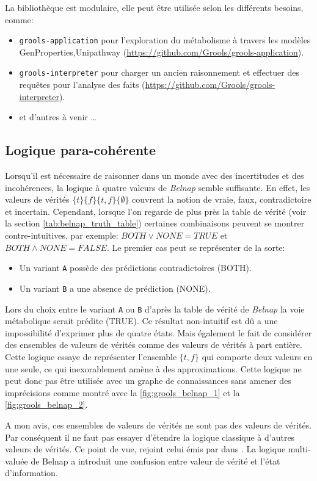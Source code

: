 \begin{refsegment}
La bibliothèque est modulaire, elle peut être utilisée selon les différents besoins, comme:\nolisttopbreak
\begin{itemize}
	\item \texttt{grools-application} pour l'exploration du métabolisme à travers les modèles GenProperties,Unipathway  (\url{https://github.com/Grools/grools-application}).
	\item \texttt{grools-interpreter} pour charger un ancien raisonnement et effectuer des requêtes pour l'analyse des faits (\url{https://github.com/Grools/grools-interpreter}).
	\item et d'autres à venir \ldots
\end{itemize}

\subsection{Logique para-cohérente}
Lorsqu'il est nécessaire de raisonner dans un monde avec des incertitudes et des incohérences, la logique à quatre valeurs de \textit{Belnap} semble suffisante. En effet, les valeurs de vérités $\{t\} \{f\} \{t,f\} \{\emptyset\}$ couvrent la notion de vraie, faux, contradictoire et incertain. Cependant, lorsque l'on regarde de plus près la table de vérité  (voir la section   \cref{tab:belnap_truth_table}) certaines combinaisons peuvent se montrer contre-intuitives, par exemple: $ BOTH \lor  NONE = TRUE$ et $ BOTH \land NONE = FALSE$. Le premier cas  peut se représenter de la sorte: 
\begin{itemize}
    \item Un variant \texttt{A} possède des prédictions contradictoires (BOTH).
    \item Un variant \texttt{B} a une absence de prédiction (NONE).
\end{itemize}
Lors du choix entre le variant \texttt{A} ou \texttt{B} d'après la table de vérité de \textit{Belnap} la voie métabolique serait prédite (TRUE). Ce résultat non-intuitif est dû a une impossibilité d'exprimer plus de quatre états. Mais également le fait de considérer des ensembles de valeurs de vérités comme des valeurs de vérités à part entière. Cette logique essaye de représenter l'ensemble $\{t,f\}$ qui comporte deux valeurs en une seule, ce qui inexorablement amène à des approximations. Cette logique ne peut donc pas être utilisée avec un graphe de connaissances sans amener des  imprécisions comme montré avec la \cref{fig:grools_belnap_1} et la  \cref{fig:grools_belnap_2}. 

A mon avis, ces ensembles de valeurs de vérités ne sont pas des valeurs de vérités. Par conséquent il ne faut pas essayer d'étendre la logique classique à d'autres valeurs de vérités. Ce point de vue, rejoint celui émis par \citeauthor{dubois2008ignorance} dans \cite{dubois2008ignorance}. La logique multi-valuée de Belnap a introduit une confusion entre valeur de vérité et l'état d'information.



\subbibliography
\end{refsegment}
